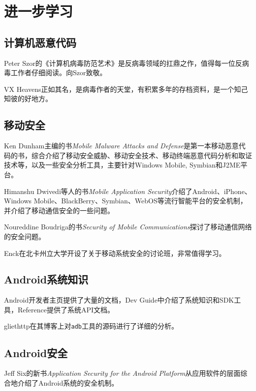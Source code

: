 \chapter{进一步学习}
\section*{计算机恶意代码}
Peter Szor的《计算机病毒防范艺术》\cite{art_virus}是反病毒领域的扛鼎之作，值得每一位反病毒工作者仔细阅读。向Szor致敬。

VX Heavens\cite{url:vx_heavens}正如其名，是病毒作者的天堂，有积累多年的存档资料，是一个知己知彼的好地方。

\section*{移动安全}
Ken Dunham主编的书{\it Mobile Malware Attacks and Defense}\cite{mobile_malware}是第一本移动恶意代码的书，综合介绍了移动安全威胁、移动安全技术、移动终端恶意代码分析和取证技术等，以及一些安全分析工具，主要针对Windows Mobile, Symbian和J2ME平台。

Himanshu Dwivedi等人的书{\it Mobile Application Security}\cite{mobile_app_security}介绍了Android、iPhone、Windows Mobile、BlackBerry、Symbian、WebOS等流行智能平台的安全机制，并介绍了移动通信安全的一些问题。

Noureddine Boudriga的书{\it Security of Mobile Communications}\cite{security_mobile_comm}探讨了移动通信网络的安全问题。

Enck在北卡州立大学开设了关于移动系统安全的讨论班，非常值得学习\cite{url:enck_seminar}。

\section*{Android系统知识}
Android开发者主页\cite{url:android_dev}提供了大量的文档，Dev Guide中介绍了系统知识和SDK工具，Reference提供了系统API文档。

gliethttp在其博客\cite{url:blog_gliethttp}上对\lstinline!adb!工具的源码进行了详细的分析。

\section*{Android安全}
Jeff Six的新书{\it Application Security for the Android Platform}\cite{android_app_security}从应用软件的层面综合地介绍了Android系统的安全机制。

